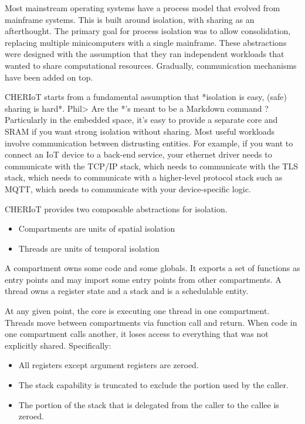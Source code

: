 Most mainstream operating systems have a process model that evolved from mainframe systems.
This is built around isolation, with sharing as an afterthought.
The primary goal for process isolation was to allow consolidation, replacing multiple minicomputers with a single mainframe.
These abstractions were designed with the assumption that they ran independent workloads that wanted to share computational resources.
Gradually, communication mechanisms have been added on top.

CHERIoT starts from a fundamental assumption that *isolation is easy, (safe) sharing is hard*.
Phil> Are the *'s meant to be a Markdown command ?
Particularly in the embedded space, it's easy to provide a separate core and SRAM if you want strong isolation without sharing.
Most useful workloads involve communication between distrusting entities.
For example, if you want to connect an IoT device to a back-end service, your ethernet driver needs to communicate with the TCP/IP stack, which needs to communicate with the TLS stack, which needs to communicate with a higher-level protocol stack such as MQTT, which needs to communicate with your device-specific logic.

CHERIoT provides two composable abstractions for isolation.

\begin{itemize}
	\item{Compartments are units of spatial isolation}
	\item{Threads are units of temporal isolation}
\end{itemize}

A compartment owns some code and some globals.
It exports a set of functions as entry points and may import some entry points from other compartments.
A thread owns a register state and a stack and is a schedulable entity.

At any given point, the core is executing one thread in one compartment.
Threads move between compartments via function call and return.
When code in one compartment calls another, it loses access to everything that was not explicitly shared.
Specifically:

\begin{itemize}
	\item{All registers except argument registers are zeroed.}
	\item{The stack capability is truncated to exclude the portion used by the caller.}
	\item{The portion of the stack that is delegated from the caller to the callee is zeroed.}
\end{itemize}

